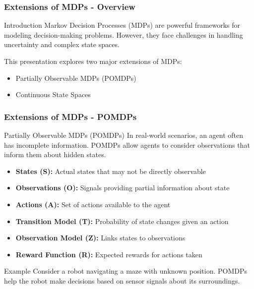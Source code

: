 \documentclass[aspectratio=169]{beamer}
\begin{document}
\begin{frame}[fragile]
    \frametitle{Extensions of MDPs - Overview}
    \begin{block}{Introduction}
        Markov Decision Processes (MDPs) are powerful frameworks for modeling decision-making problems. However, they face challenges in handling uncertainty and complex state spaces. 
    \end{block}
    This presentation explores two major extensions of MDPs:
    \begin{itemize}
        \item Partially Observable MDPs (POMDPs)
        \item Continuous State Spaces
    \end{itemize}
\end{frame}

\begin{frame}[fragile]
    \frametitle{Extensions of MDPs - POMDPs}
    \begin{block}{Partially Observable MDPs (POMDPs)}
        In real-world scenarios, an agent often has incomplete information. POMDPs allow agents to consider observations that inform them about hidden states.
    \end{block}

    \begin{itemize}
        \item \textbf{States (S):} Actual states that may not be directly observable
        \item \textbf{Observations (O):} Signals providing partial information about state
        \item \textbf{Actions (A):} Set of actions available to the agent
        \item \textbf{Transition Model (T):} Probability of state changes given an action
        \item \textbf{Observation Model (Z):} Links states to observations
        \item \textbf{Reward Function (R):} Expected rewards for actions taken
    \end{itemize}

    \begin{block}{Example}
        Consider a robot navigating a maze with unknown position. POMDPs help the robot make decisions based on sensor signals about its surroundings.
    \end{block}
\end{frame}
\end{document}
